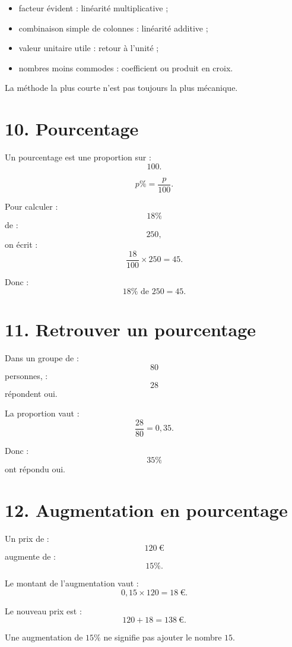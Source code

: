 \begin{methode}
\begin{itemize}
\item facteur évident : linéarité multiplicative ;
\item combinaison simple de colonnes : linéarité additive ;
\item valeur unitaire utile : retour à l'unité ;
\item nombres moins commodes : coefficient ou produit en croix.
\end{itemize}
\end{methode}

La méthode la plus courte n'est pas toujours la plus mécanique.

\section{10. Pourcentage}

Un pourcentage est une proportion sur :
\[
100.
\]

\[
p\%=\dfrac{p}{100}.
\]

Pour calculer :
\[
18\%
\]
de :
\[
250,
\]
on écrit :
\[
\dfrac{18}{100}\times250=45.
\]

Donc :
\[
\boxed{18\%\text{ de }250=45}.
\]

\section{11. Retrouver un pourcentage}

Dans un groupe de :
\[
80
\]
personnes, :
\[
28
\]
répondent oui.

La proportion vaut :
\[
\dfrac{28}{80}=0{,}35.
\]

Donc :
\[
\boxed{35\%}
\]
ont répondu oui.

\section{12. Augmentation en pourcentage}

Un prix de :
\[
120\ \text{€}
\]
augmente de :
\[
15\%.
\]

Le montant de l'augmentation vaut :
\[
0{,}15\times120=18\ \text{€}.
\]

Le nouveau prix est :
\[
120+18=138\ \text{€}.
\]

\begin{remarque}
Une augmentation de $15\%$ ne signifie pas ajouter le nombre $15$.
\end{remarque}


